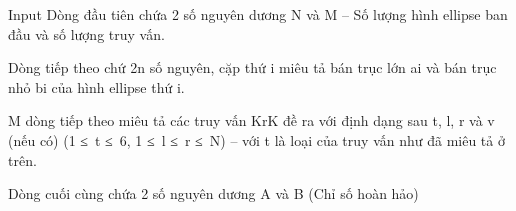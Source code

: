 Input  
Dòng đầu tiên chứa 2 số nguyên dương N và M – Số lượng hình ellipse ban đầu và số lượng truy vấn.  

   Dòng tiếp theo chứ 2n số nguyên, cặp thứ i miêu tả bán trục lớn ai và bán trục nhỏ bi của hình ellipse thứ i.  

   M dòng tiếp theo miêu tả các truy vấn KrK đề ra với định dạng sau t, l, r và v (nếu có) (1 ≤ t ≤ 6, 1 ≤ l ≤ r ≤ N) – với t là loại của truy vấn như đã miêu tả ở trên.  

   Dòng cuối cùng chứa 2 số nguyên dương A và B (Chỉ số hoàn hảo)